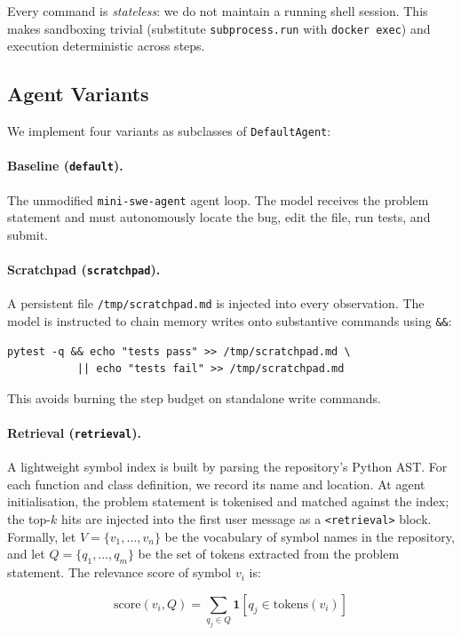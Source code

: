\documentclass[11pt]{article}
\begin{document}
Every command is \emph{stateless}: we do not maintain a running shell session.
This makes sandboxing trivial (substitute \texttt{subprocess.run} with
\texttt{docker exec}) and execution deterministic across steps.

\subsection{Agent Variants}
\label{sec:variants}

We implement four variants as subclasses of \texttt{DefaultAgent}:

\paragraph{Baseline (\texttt{default}).}
The unmodified \texttt{mini-swe-agent} agent loop.  The model receives the
problem statement and must autonomously locate the bug, edit the file, run
tests, and submit.

\paragraph{Scratchpad (\texttt{scratchpad}).}
A persistent file \texttt{/tmp/scratchpad.md} is injected into every
observation.  The model is instructed to chain memory writes onto substantive
commands using \texttt{\&\&}:
\begin{lstlisting}
pytest -q && echo "tests pass" >> /tmp/scratchpad.md \
           || echo "tests fail" >> /tmp/scratchpad.md
\end{lstlisting}
This avoids burning the step budget on standalone write commands.

\paragraph{Retrieval (\texttt{retrieval}).}
A lightweight symbol index is built by parsing the repository's Python AST.
For each function and class definition, we record its name and location.  At
agent initialisation, the problem statement is tokenised and matched against
the index; the top-$k$ hits are injected into the first user message as a
\texttt{<retrieval>} block.  Formally, let $V = \{v_1, \ldots, v_n\}$ be the
vocabulary of symbol names in the repository, and let
$Q = \{q_1, \ldots, q_m\}$ be the set of tokens extracted from the problem
statement.  The relevance score of symbol $v_i$ is:

\begin{equation}
  \text{score}(v_i, Q) = \sum_{q_j \in Q} \mathbf{1}[q_j \in \text{tokens}(v_i)]
  \label{eq:retrieval-score}
\end{equation}
\end{document}
